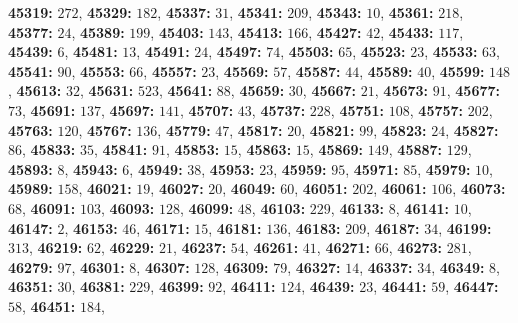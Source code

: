 \textsf{\bfseries 45319:} $272$, \textsf{\bfseries 45329:} $182$, \textsf{\bfseries 45337:} $31$, \textsf{\bfseries 45341:} $209$, \textsf{\bfseries 45343:} $10$, \textsf{\bfseries 45361:} $218$, \textsf{\bfseries 45377:} $24$, \textsf{\bfseries 45389:} $199$, \textsf{\bfseries 45403:} $143$, \textsf{\bfseries 45413:} $166$, \textsf{\bfseries 45427:} $42$, \textsf{\bfseries 45433:} $117$, \textsf{\bfseries 45439:} $6$, \textsf{\bfseries 45481:} $13$, \textsf{\bfseries 45491:} $24$, \textsf{\bfseries 45497:} $74$, \textsf{\bfseries 45503:} $65$, \textsf{\bfseries 45523:} $23$, \textsf{\bfseries 45533:} $63$, \textsf{\bfseries 45541:} $90$, \textsf{\bfseries 45553:} $66$, \textsf{\bfseries 45557:} $23$, \textsf{\bfseries 45569:} $57$, \textsf{\bfseries 45587:} $44$, \textsf{\bfseries 45589:} $40$, \textsf{\bfseries 45599:} $148$, \textsf{\bfseries 45613:} $32$, \textsf{\bfseries 45631:} $523$, \textsf{\bfseries 45641:} $88$, \textsf{\bfseries 45659:} $30$, \textsf{\bfseries 45667:} $21$, \textsf{\bfseries 45673:} $91$, \textsf{\bfseries 45677:} $73$, \textsf{\bfseries 45691:} $137$, \textsf{\bfseries 45697:} $141$, \textsf{\bfseries 45707:} $43$, \textsf{\bfseries 45737:} $228$, \textsf{\bfseries 45751:} $108$, \textsf{\bfseries 45757:} $202$, \textsf{\bfseries 45763:} $120$, \textsf{\bfseries 45767:} $136$, \textsf{\bfseries 45779:} $47$, \textsf{\bfseries 45817:} $20$, \textsf{\bfseries 45821:} $99$, \textsf{\bfseries 45823:} $24$, \textsf{\bfseries 45827:} $86$, \textsf{\bfseries 45833:} $35$, \textsf{\bfseries 45841:} $91$, \textsf{\bfseries 45853:} $15$, \textsf{\bfseries 45863:} $15$, \textsf{\bfseries 45869:} $149$, \textsf{\bfseries 45887:} $129$, \textsf{\bfseries 45893:} $8$, \textsf{\bfseries 45943:} $6$, \textsf{\bfseries 45949:} $38$, \textsf{\bfseries 45953:} $23$, \textsf{\bfseries 45959:} $95$, \textsf{\bfseries 45971:} $85$, \textsf{\bfseries 45979:} $10$, \textsf{\bfseries 45989:} $158$, \textsf{\bfseries 46021:} $19$, \textsf{\bfseries 46027:} $20$, \textsf{\bfseries 46049:} $60$, \textsf{\bfseries 46051:} $202$, \textsf{\bfseries 46061:} $106$, \textsf{\bfseries 46073:} $68$, \textsf{\bfseries 46091:} $103$, \textsf{\bfseries 46093:} $128$, \textsf{\bfseries 46099:} $48$, \textsf{\bfseries 46103:} $229$, \textsf{\bfseries 46133:} $8$, \textsf{\bfseries 46141:} $10$, \textsf{\bfseries 46147:} $2$, \textsf{\bfseries 46153:} $46$, \textsf{\bfseries 46171:} $15$, \textsf{\bfseries 46181:} $136$, \textsf{\bfseries 46183:} $209$, \textsf{\bfseries 46187:} $34$, \textsf{\bfseries 46199:} $313$, \textsf{\bfseries 46219:} $62$, \textsf{\bfseries 46229:} $21$, \textsf{\bfseries 46237:} $54$, \textsf{\bfseries 46261:} $41$, \textsf{\bfseries 46271:} $66$, \textsf{\bfseries 46273:} $281$, \textsf{\bfseries 46279:} $97$, \textsf{\bfseries 46301:} $8$, \textsf{\bfseries 46307:} $128$, \textsf{\bfseries 46309:} $79$, \textsf{\bfseries 46327:} $14$, \textsf{\bfseries 46337:} $34$, \textsf{\bfseries 46349:} $8$, \textsf{\bfseries 46351:} $30$, \textsf{\bfseries 46381:} $229$, \textsf{\bfseries 46399:} $92$, \textsf{\bfseries 46411:} $124$, \textsf{\bfseries 46439:} $23$, \textsf{\bfseries 46441:} $59$, \textsf{\bfseries 46447:} $58$, \textsf{\bfseries 46451:} $184$, 
